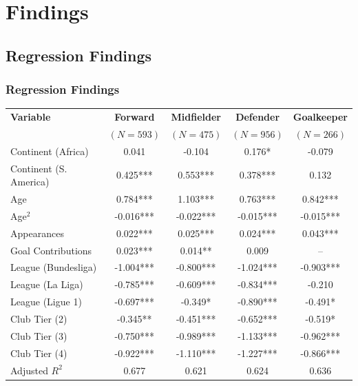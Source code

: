 \documentclass[t,aspectratio=169,xcolor=dvipsnames]{beamer}
\begin{document}
\section{Findings}
\subsection{Regression Findings}
\begin{frame}[shrink=10]
    \frametitle{Regression Findings} 
    
    \begin{table}[ht]
        \scriptsize
        \centering
        \setlength{\tabcolsep}{3pt}
        \begin{tabular}{l|cccc}
            \hline
            \textbf{Variable} & \textbf{Forward} & \textbf{Midfielder} & \textbf{Defender} & \textbf{Goalkeeper} \\
            & $(N=593)$ & $(N=475)$ & $(N=956)$ & $(N=266)$ \\
            \hline
            Continent (Africa) & 0.041 & -0.104 & 0.176* & -0.079 \\
            Continent (S. America) & 0.425*** & 0.553*** & 0.378*** & 0.132 \\
            Age & 0.784*** & 1.103*** & 0.763*** & 0.842*** \\
            Age$^2$ & -0.016*** & -0.022*** & -0.015*** & -0.015*** \\
            Appearances & 0.022*** & 0.025*** & 0.024*** & 0.043*** \\
            Goal Contributions & 0.023*** & 0.014** & 0.009 & -- \\
            League (Bundesliga) & -1.004*** & -0.800*** & -1.024*** & -0.903*** \\
            League (La Liga) & -0.785*** & -0.609*** & -0.834*** & -0.210 \\
            League (Ligue 1) & -0.697*** & -0.349* & -0.890*** & -0.491* \\
            Club Tier (2) & -0.345** & -0.451*** & -0.652*** & -0.519* \\
            Club Tier (3) & -0.750*** & -0.989*** & -1.133*** & -0.962*** \\
            Club Tier (4) & -0.922*** & -1.110*** & -1.227*** & -0.866*** \\
            \hline
            Adjusted $R^2$ & 0.677 & 0.621 & 0.624 & 0.636 \\
            \hline
        \end{tabular}
        

\end{table}
\end{frame}
\end{document}
